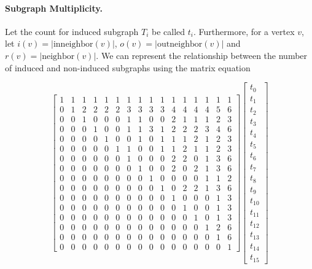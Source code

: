 \documentclass[11pt]{article}
\renewcommand{\subsection}[1]{\paragraph{\textbf{#1}.}}
\newcommand{\abs}[1]{{\lvert#1 \rvert}}
\begin{document}
\subsection{Subgraph Multiplicity}

Let the count for induced subgraph $T_i$ be called $t_i$.  Furthermore, for
a vertex $v$, let $i(v)=\abs{\mathrm{inneighbor}(v)}$, 
$o(v)=\abs{\mathrm{outneighbor}(v)}$ and $r(v) = \abs{\mathrm{neighbor}(v)}$.
We can represent the relationship between the number of induced and non-induced 
subgraphs using the matrix equation

\vspace*{-10pt}
{\small
\setcounter{MaxMatrixCols}{16}
\[
\begin{bmatrix}
1&1&1&1&1&1&1&1&1&1&1&1&1&1&1&1 \\
0&1&2&2&2&2&3&3&3&3&4&4&4&4&5&6 \\
0&0&1&0&0&0&1&1&0&0&2&1&1&1&2&3 \\
0&0&0&1&0&0&1&1&3&1&2&2&2&3&4&6 \\
0&0&0&0&1&0&0&1&0&1&1&1&2&1&2&3 \\
0&0&0&0&0&1&1&0&0&1&1&2&1&1&2&3 \\
0&0&0&0&0&0&1&0&0&0&2&2&0&1&3&6 \\
0&0&0&0&0&0&0&1&0&0&2&0&2&1&3&6 \\
0&0&0&0&0&0&0&0&1&0&0&0&0&1&1&2 \\
0&0&0&0&0&0&0&0&0&1&0&2&2&1&3&6 \\
0&0&0&0&0&0&0&0&0&0&1&0&0&0&1&3 \\
0&0&0&0&0&0&0&0&0&0&0&1&0&0&1&3 \\
0&0&0&0&0&0&0&0&0&0&0&0&1&0&1&3 \\
0&0&0&0&0&0&0&0&0&0&0&0&0&1&2&6 \\
0&0&0&0&0&0&0&0&0&0&0&0&0&0&1&6 \\
0&0&0&0&0&0&0&0&0&0&0&0&0&0&0&1
\end{bmatrix}
\begin{bmatrix}
t_0 \\ t_1 \\ t_2 \\ t_3 \\ t_4 \\ t_5 \\ t_6 \\ t_7 \\ t_8 \\ 
t_9 \\ t_{10} \\ t_{11} \\ t_{12} \\ t_{13} \\ t_{14} \\ t_{15}

\end{bmatrix}\]}
\end{document}
